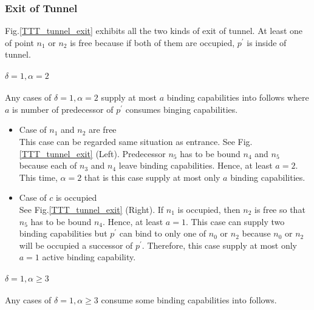 \documentclass[runningheads]{llncs}
\begin{document}
\subsubsection{Exit of Tunnel}


Fig.\ref{TTT_tunnel_exit} exhibits all the two kinds of exit of tunnel. 
At least one of point $n_1$ or $n_2$ is free because if both of them are occupied, $p^\prime$ is inside of tunnel.

\paragraph{$\delta = 1, \alpha = 2$}
 Any cases of $\delta = 1, \alpha = 2$ supply at most $a$ binding capabilities into follows where $a$ is number of predecessor of $p^\prime$ consumes binging capabilities.

\begin{itemize}
\item{Case of $n_1$ and $n_2$ are free}\\
  This case can be regarded same situation as entrance. See Fig.\ref{TTT_tunnel_exit} (Left). Predecessor $n_5$ has to be bound $n_4$ and $n_5$ because each of $n_3$ and $n_4$ leave binding capabilities. Hence, at least $a=2$. This time, $\alpha = 2$ that is this case supply at most only $a$ binding capabilities.
  
\item{Case of $c$ is occupied}\\
  See Fig.\ref{TTT_tunnel_exit} (Right). If $n_1$ is occupied, then $n_2$ is free so that $n_5$ has to be bound $n_4$. Hence, at least $a=1$. This case can supply two binding capabilities but $p^\prime$ can bind to only one of $n_0$ or $n_2$ because $n_0$ or $n_2$ will be occupied a successor of $p^\prime$. Therefore, this case supply at most only $a=1$ active binding capability.
  
\end{itemize}

\paragraph{$\delta = 1, \alpha \geq 3$}
Any cases of $\delta = 1, \alpha \geq 3$ consume some binding capabilities into follows.
\end{document}
